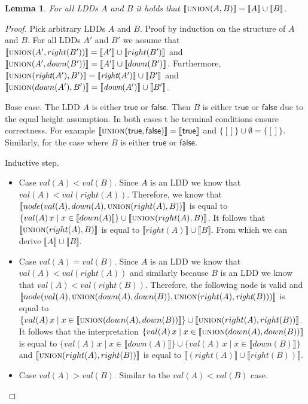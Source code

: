 \documentclass{article}
\newtheorem{lemma}[theorem]{Lemma}
\newcommand{\var}[1]{\ensuremath{\textit{#1}}}
\newcommand{\interpret}[1]{\llbracket #1 \rrbracket}
\newcommand{\lddright}{\textit{right}}
\newcommand{\lddval}{\textit{val}}
\begin{document}
\begin{lemma}
	For all LDDs $A$ and $B$ it holds that $\interpret{\textsc{union}(A, B)} = \interpret{A} \cup \interpret{B}$.
\end{lemma}
\begin{proof}
	Pick arbitrary LDDs $A$ and $B$.
	Proof by induction on the structure of $A$ and $B$.	
	For all LDDs $A'$ and $B'$ we assume that $\interpret{\textsc{union}(A', right(B'))} = \interpret{A'} \cup \interpret{right(B')}$ and $\interpret{\textsc{union}(A', down(B'))} = \interpret{A'} \cup \interpret{down(B')}$.
	Furthermore, $\interpret{\textsc{union}(\var{right}(A'), B')} = \interpret{\var{right}(A')} \cup \interpret{B'}$ and $\interpret{\textsc{union}(down(A'), B')} = \interpret{\var{down}(A')} \cup \interpret{B'}$.
	
	Base case.
	The LDD $A$ is either $\textsf{true}$ or $\textsf{false}$.
	Then $B$ is either $\textsf{true}$ or $\textsf{false}$ due to the equal height assumption.
	In both cases t he terminal conditions ensure correctness.
	For example $\interpret{\textsc{union}(\textsf{true}, \textsf{false})} = \interpret{\textsf{true}}$ and $\{[]\} \cup \emptyset = \{[]\}$.	
	Similarly, for the case where $B$ is either $\textsf{true}$ or $\textsf{false}$.
	
	Inductive step.
	\begin{itemize}
	\item Case $val(A) < val(B)$.
		Since $A$ is an LDD we know that $\lddval(A) < \lddval(\lddright(A))$.
		Therefore, we know that $\interpret{node(val(A), down(A), \textsc{union}(right(A), B))}$ is equal to $\{val(A)\,x \mid x \in \interpret{down(A)}\} \cup \interpret{\textsc{union}(right(A), B)}$.
		It follows that $\interpret{\textsc{union}(right(A), B)}$ is equal to $\interpret{right(A)} \cup \interpret{B}$.
		From which we can derive $\interpret{A} \cup \interpret{B}$.

	\item Case $val(A) = val(B)$.
		Since $A$ is an LDD we know that $\lddval(A) < \lddval(\lddright(A))$ and similarly because $B$ is an LDD we know that $\lddval(A) < \lddval(\lddright(B))$.
		Therefore, the following node is valid and $\interpret{node(val(A), \textsc{union}(down(A), down(B)), \textsc{union}(right(A), \var{right}(B)))}$ is equal to  $\{val(A)\,x \mid x \in \interpret{\textsc{union}(down(A), down(B))}\} \cup \interpret{\textsc{union}(right(A), right(B))}$.
		It follows that the interpretation $\{val(A)\,x \mid x \in \interpret{\textsc{union}(down(A), down(B))}$ is equal to $\{val(A)\,x \mid x \in \interpret{down(A)}\} \cup \{val(A)\,x \mid x \in \interpret{down(B)}\}$ and $\interpret{\textsc{union}(right(A), right(B))}$ is equal to $\interpret{(right(A)} \cup \interpret{right(B))}$.
	
	\item Case $val(A) > val(B)$.
		Similar to the $val(A) < val(B)$ case.	\qedhere	
	\end{itemize} 
\end{proof}
\end{document}
